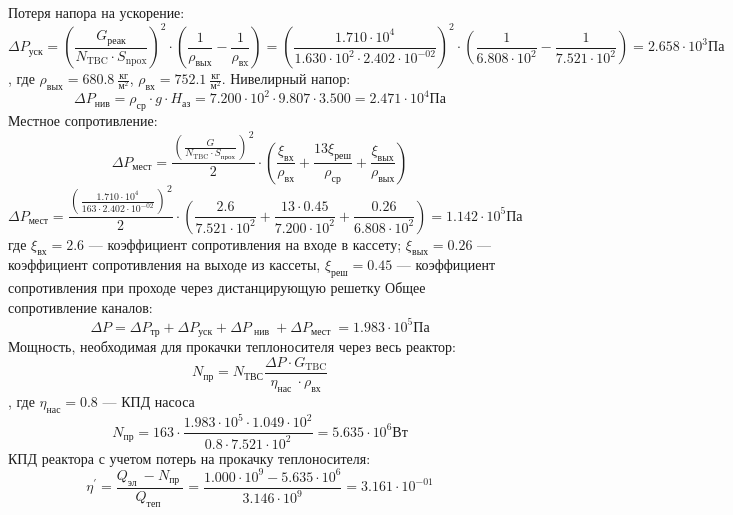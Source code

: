 \noindent Потеря напора на ускорение:
\begin{equation}
\Delta P_{\mathrm{уск}} = \left( \frac{G_{\text{реак}}}{N_{\mathrm{TBC}} \cdot S_{\mathrm{npox}}} \right)^{2} \cdot \left(\frac{1}{\rho_{\mathrm{вых}}} - \frac{1}{\rho_{\mathrm{вx}}} \right)
= 
\left( \frac{ 1.710 \cdot 10^{ 4 } } { 1.630 \cdot 10^{ 2 } \cdot 2.402 \cdot 10^{ -02 } } \right)^2 \cdot \left(\frac 1 { 6.808 \cdot 10^{ 2 } } - \frac 1  { 7.521 \cdot 10^{ 2 } } \right) =  2.658 \cdot 10^{ 3 } \text{Па}
\end{equation}, где $\rho_{\text{вых}} = 680.8\ \frac{\text{кг}}{\text{м}^2} $, $\rho_{\text{вх}} =752.1\  \frac {\text{кг}}{\text{м}^2}$.
\newline
\noindent Нивелирный напор:
$$
\Delta P_{\text{нив}} = \rho_{\text{ср}} \cdot g \cdot H_{\text{аз}}
=
7.200 \cdot 10^{ 2 } \cdot 9.807 \cdot 3.500  = 2.471 \cdot 10^{ 4 } \text{Па}
$$
Местное сопротивление:
$$
\Delta P_{\mathrm{мест}} = \frac{ \left( \frac{G}{N_{\mathrm{TBC}} \cdot S_{\mathrm{прох}}} \right)^{2} }{2} \cdot \left( \frac{\xi_{\mathrm{вх}}}{\rho_{\mathrm{вх}}}+\frac{13 \xi_{\mathrm{реш}}}{\rho_{\mathrm{ср}}}+\frac{ \xi_{\mathrm{вых}}}{\rho_{\mathrm{вых}}} \right)
$$
\[
    \Delta P_{\text{мест}} = \frac{ \left( \frac{1.710 \cdot 10^{ 4 }} {163 \cdot 2.402 \cdot 10^{ -02 } }  \right)^2 } {2} \cdot \left( \frac{ 2.6 }{ 7.521 \cdot 10^{ 2 } } +\frac{ 13 \cdot 0.45 }{7.200 \cdot 10^{ 2 }}+\frac{0.26} { 6.808 \cdot 10^{ 2 } } \right) = 1.142 \cdot 10^{ 5 } \text{Па}
\]
где $\xi_{\text{вх}}= 2.6 $ — коэффициент сопротивления на входе в кассету; $\xi_{\text{вых}} = 0.26$ — коэффициент сопротивления на выходе из кассеты, $\xi_{\text{реш}} = 0.45$ — коэффициент сопротивления при проходе через дистанцирующую решетку %
Общее сопротивление каналов:
$$
\Delta P=\Delta P_{\mathrm{тр}}+\Delta P_{\mathrm{уск}}+\Delta P_{\text { нив }}+\Delta P_{\text {мест }} = 1.983 \cdot 10^{ 5 } \text{Па} 
$$
Мощность, необходимая для прокачки теплоносителя через весь реактор:
$$
N_{\mathrm{пр}}=N_{\mathrm{ТВС}} \frac{\Delta P \cdot G_{\mathrm{TBC}}}{\eta_{\text {нас }} \cdot \rho_{\mathrm{вх}}}
$$, где $\eta_{\text{нас}}=0.8$ — КПД насоса
\[
  N_{\text{пр}} = 163 \cdot \frac {1.983 \cdot 10^{ 5 } \cdot 1.049 \cdot 10^{ 2 }} {0.8 \cdot 7.521 \cdot 10^{ 2 }} = 5.635 \cdot 10^{ 6 } \text{Вт}  
\]
\noindent КПД реактора с учетом потерь на прокачку теплоносителя:
$$
\eta^{\prime}=\frac{Q_{\text {эл }}-N_{\text {пр }}}{Q_{\text {теп }}} = \frac{1.000 \cdot 10^{ 9 } - 5.635 \cdot 10^{ 6 }}{3.146 \cdot 10^{ 9 }}={3.161 \cdot 10^{ -01 }}
$$

